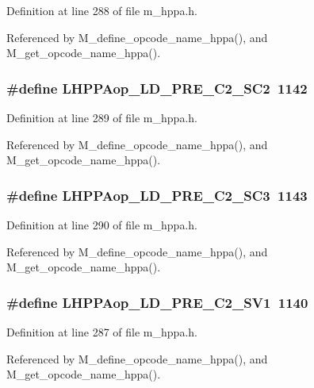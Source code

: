 Definition at line 288 of file m\_\-hppa.h.

Referenced by M\_\-define\_\-opcode\_\-name\_\-hppa(), and M\_\-get\_\-opcode\_\-name\_\-hppa().
\subsubsection{\setlength{\rightskip}{0pt plus 5cm}\#define LHPPAop\_\-LD\_\-PRE\_\-C2\_\-SC2~1142}\label{m__hppa_8h_9624d493610ad7b34177ab811452e70a}




Definition at line 289 of file m\_\-hppa.h.

Referenced by M\_\-define\_\-opcode\_\-name\_\-hppa(), and M\_\-get\_\-opcode\_\-name\_\-hppa().
\subsubsection{\setlength{\rightskip}{0pt plus 5cm}\#define LHPPAop\_\-LD\_\-PRE\_\-C2\_\-SC3~1143}\label{m__hppa_8h_15cee95e178a3e9690e66fa31ebc2b98}




Definition at line 290 of file m\_\-hppa.h.

Referenced by M\_\-define\_\-opcode\_\-name\_\-hppa(), and M\_\-get\_\-opcode\_\-name\_\-hppa().
\subsubsection{\setlength{\rightskip}{0pt plus 5cm}\#define LHPPAop\_\-LD\_\-PRE\_\-C2\_\-SV1~1140}\label{m__hppa_8h_7f33c081ab6ce726aed1998e74fe8a04}




Definition at line 287 of file m\_\-hppa.h.

Referenced by M\_\-define\_\-opcode\_\-name\_\-hppa(), and M\_\-get\_\-opcode\_\-name\_\-hppa().
